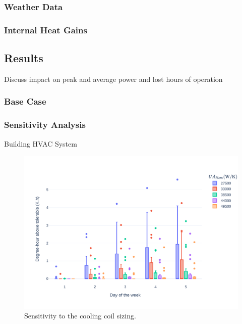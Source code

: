 \subsubsection{Weather Data} \label{sec:weather}



\subsubsection{Internal Heat Gains} \label{sec:gains}


\subsection{Results} \label{sec:results}

Discuss impact on peak and average power and lost hours of operation

\subsubsection{Base Case} \label{sec:base}


\subsubsection{Sensitivity Analysis} \label{sec:sensitivity}

Building HVAC System

\begin{figure}[!htbp]
\centering
\includegraphics[width=\linewidth]{figures/CoilSizing.pdf}
\caption{Sensitivity to the cooling coil sizing.}
\label{fig:coil}
\end{figure}

